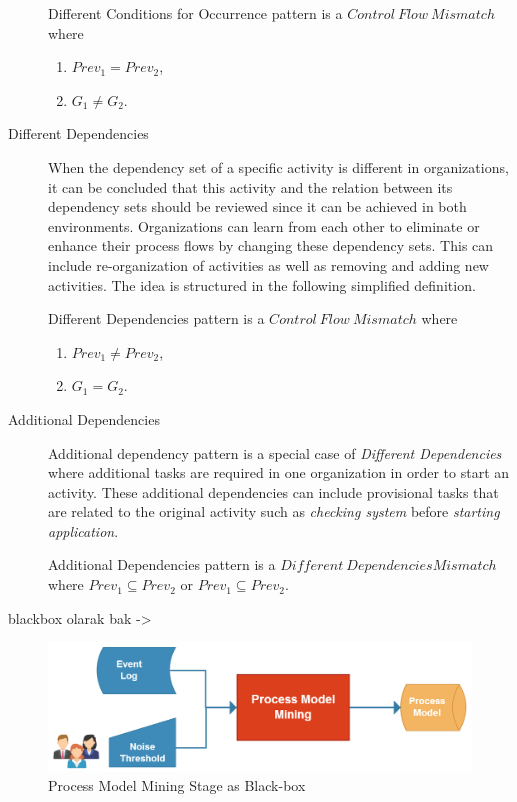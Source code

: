 \begin{description}
		\theoremstyle{definition}
		\begin{definition}
		Different Conditions for Occurrence pattern is a ${Control\ Flow\ Mismatch}$ where
		\begin{enumerate}
			\item $Prev_{1} = Prev_{2}$,
			\item $G_{1} \neq G_{2}$.
		\end{enumerate}
		\end{definition}

	\item[Different Dependencies] When the dependency set of a specific activity is different in organizations, it can be concluded that this activity and the relation between its dependency sets should be reviewed since it can be achieved in both environments. Organizations can learn from each other to eliminate or enhance their process flows by changing these dependency sets. This can include re-organization of activities as well as removing and adding new activities. The idea is structured in the following simplified definition.
		\theoremstyle{definition}
		\begin{definition}
		Different Dependencies pattern is a ${Control\ Flow\ Mismatch}$ where
		\begin{enumerate}
			\item $Prev_{1} \neq Prev_{2}$,
			\item $G_{1} = G_{2}$.
		\end{enumerate}
		\end{definition}	
	\item[Additional Dependencies] Additional dependency pattern is a special case of \textit{Different Dependencies} where additional tasks are required in one organization in order to start an activity. These additional dependencies can include provisional tasks that are related to the original activity such as \textit{checking system} before \textit{starting application}. 
		\theoremstyle{definition}
		\begin{definition}
		Additional Dependencies pattern is a ${Different\ Dependencies Mismatch}$ where $Prev_{1} \subseteq Prev_{2}$ or $Prev_{1} \subseteq Prev_{2}$.
		\end{definition}
 \end{description}
 

blackbox olarak bak -> 
\begin{figure}
  \centering
  \includegraphics[width=\textwidth]{4_methodology/process-model-mining-blackbox}
  \caption{Process Model Mining Stage as Black-box }
  \label{fig:process-model-mining-blackbox}
\end{figure}

